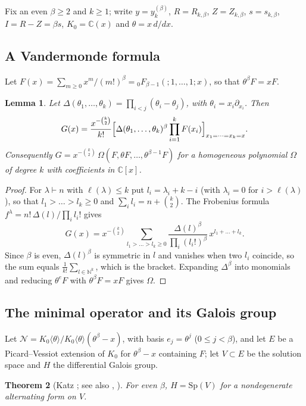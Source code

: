 \documentclass[11pt]{amsart}
\newtheorem{thm}{Theorem}[section]
\newtheorem{lemma}[thm]{Lemma}
\theoremstyle{definition}
\newcommand{\C}{\mathbb C}
\newcommand{\N}{\mathbb N}
\newcommand{\Sp}{\mathrm{Sp}}
\begin{document}
Fix an even $\beta\ge2$ and $k\ge1$; write $y=y^{(\beta)}_k$, $R=R_{k,\beta}$, $Z=Z_{k,\beta}$, $s=s_{k,\beta}$, $I=R-Z=\beta s$, $K_0=\C(x)$ and $\theta=x\,d/dx$.

\subsection{A Vandermonde formula}
Let $F(x)=\sum_{m\ge0}x^m/(m!)^\beta={}_0F_{\beta-1}(;1,\dots,1;x)$, so that $\theta^\beta F=xF$.

\begin{lemma}\label{lem:vdm}
Let $\Delta(\theta_1,\dots,\theta_k)=\prod_{i<j}(\theta_i-\theta_j)$, with $\theta_i=x_i\partial_{x_i}$. Then
\[
G(x)=\frac{x^{-\binom k2}}{k!}\Bigl[\Delta(\theta_1,\dots,\theta_k)^\beta\prod_{i=1}^kF(x_i)\Bigr]_{x_1=\dots=x_k=x}.
\]
Consequently $G=x^{-\binom k2}\,\Omega(F,\theta F,\dots,\theta^{\beta-1}F)$ for a homogeneous polynomial $\Omega$ of degree $k$ with coefficients in $\C[x]$.
\end{lemma}

\begin{proof}
For $\lambda\vdash n$ with $\ell(\lambda)\le k$ put $l_i=\lambda_i+k-i$ (with $\lambda_i=0$ for $i>\ell(\lambda)$), so that $l_1>\dots>l_k\ge0$ and $\sum_il_i=n+\binom k2$. The Frobenius formula $f^\lambda=n!\,\Delta(l)/\prod_il_i!$ gives
\[
G(x)=x^{-\binom k2}\sum_{l_1>\dots>l_k\ge0}\frac{\Delta(l)^\beta}{\prod_i(l_i!)^\beta}\,x^{l_1+\dots+l_k}.
\]
Since $\beta$ is even, $\Delta(l)^\beta$ is symmetric in $l$ and vanishes when two $l_i$ coincide, so the sum equals $\frac1{k!}\sum_{l\in\N^k}$, which is the bracket. Expanding $\Delta^\beta$ into monomials and reducing $\theta^eF$ with $\theta^\beta F=xF$ gives $\Omega$.
\end{proof}

\subsection{The minimal operator and its Galois group}
Let $\mathcal N=K_0\langle\theta\rangle/K_0\langle\theta\rangle(\theta^\beta-x)$, with basis $e_j=\theta^j$ ($0\le j<\beta$), and let $E$ be a Picard--Vessiot extension of $K_0$ for $\theta^\beta-x$ containing $F$; let $V\subset E$ be the solution space and $H$ the differential Galois group.

\begin{thm}[{Katz \cite[Corollary~4.4.8]{Kat87}; see also \cite{BBH88}, \cite[Ch.~3]{Kat90}}]\label{thm:katz}
For even $\beta$, $H=\Sp(V)$ for a nondegenerate alternating form on $V$.
\end{thm}
\end{document}
